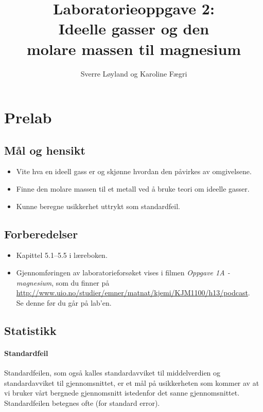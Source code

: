 
 

\title{Laboratorieoppgave 2:\\
	Ideelle gasser og den \\
	molare massen til magnesium}
\author{Sverre Løyland og Karoline Fægri}
\date{}


	
	\maketitle
	
	\section{Prelab}
	
	\subsection{Mål og hensikt}
	\begin{itemize}
		\item Vite hva en ideell gass er og skjønne hvordan den påvirkes av omgivelsene.
		\item Finne den molare massen til et metall ved å bruke teori om ideelle gasser.
		\item Kunne beregne usikkerhet uttrykt som standardfeil. 
	\end{itemize}
	
	\subsection{Forberedelser}
	\begin{itemize}
		\item Kapittel 5.1--5.5 i læreboken.
		\item Gjennomføringen av laboratorieforsøket vises i filmen \emph{Oppgave 1A - magnesium}, som du finner på \\ \url{http://www.uio.no/studier/emner/matnat/kjemi/KJM1100/h13/podcast}. \\
		Se denne før du går på lab'en.
	\end{itemize}
	
	\subsection{Statistikk}
	\paragraph{Standardfeil}
	Standardfeilen, som også kalles standardavviket til middelverdien og standardavviket til gjennomsnittet, er et mål på usikkerheten som kommer av at vi bruker vårt bergnede gjennomsnitt istedenfor det sanne gjennomsnittet. Standardfeilen betegnes ofte \SE (for standard error).
	
